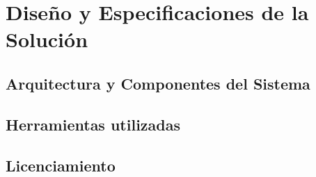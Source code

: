 \chapter{Diseño y Especificaciones de la Solución}

\section{Arquitectura y Componentes del Sistema}

\section{Herramientas utilizadas}

\section{Licenciamiento}
